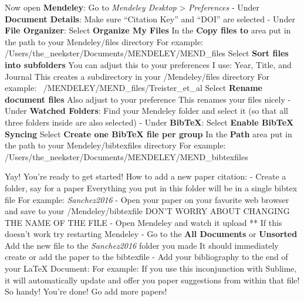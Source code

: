 Now open \textbf{Mendeley}:
Go to \textit{Mendeley Desktop} > \textit{Preferences} 
- Under \textbf{Document Details}:
	Make sure ``Citation Key'' and ``DOI'' are selected
- Under \textbf{File Organizer}:
	Select \textbf{Organize My Files}
		In the \textbf{Copy files to} area put in the path to your Mendeley/files directory
		For example: /Users/the_neekster/Documents/MENDELEY/MEND_files
	Select \textbf{Sort files into subfolders}
		You can adjust this to your preferences
		I use: Year, Title, and Journal
		This creates a subdirectory in your /Mendeley/files directory
		For example: ~/MENDELEY/MEND_files/Treister_et_al
	Select \textbf{Rename document files}
		Also adjust to your preference
		This renames your files nicely
- Under \textbf{Watched Folders}:
	Find your Mendeley folder and select it (so that all three folders inside are also selected)
- Under \textbf{BibTeX}:
	Select \textbf{Enable BibTeX Syncing}
	Select \textbf{Create one BibTeX file per group}
		In the \textbf{Path} area put in the path to your Mendeley/bibtexfiles directory
		For example: /Users/the_neekster/Documents/MENDELEY/MEND_bibtexfiles

Yay! You're ready to get started!
How to add a new paper citation:
- Create a folder, say for a paper 
	Everything you put in this folder will be in a single bibtex file
	For example: \textit{Sanchez2016}
- Open your paper on your favorite web browser and save to your /Mendeley/bibtexfile
	DON'T WORRY ABOUT CHANGING THE NAME OF THE FILE
- Open Mendeley and watch it upload 
	** If this doesn't work try restarting Mendeley
- Go to the \textbf{All Documents} or \textbf{Unsorted}
	Add the new file to the \textit{Sanchez2016} folder you made 
	It should immediately create or add the paper to the bibtexfile
- Add your bibliography to the end of your LaTeX Document:
	For example: 
	If you use this inconjunction with Sublime, it will automatically update and offer you paper suggestions from within that file! So handy! 
You're done! Go add more papers!

